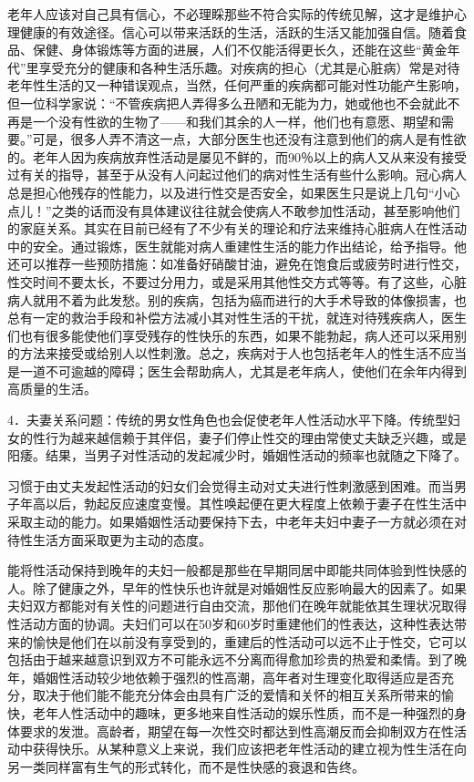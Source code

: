 \documentclass[12pt,UTF8,openany]{ctexbook}
\begin{document}
老年人应该对自己具有信心，不必理睬那些不符合实际的传统见解，这才是维护心理健康的有效途径。信心可以带来活跃的生活，活跃的生活又能加强自信。随着食品、保健、身体锻炼等方面的进展，人们不仅能活得更长久，还能在这些“黄金年代”里享受充分的健康和各种生活乐趣。对疾病的担心（尤其是心脏病）常是对待老年性生活的又一种错误观点，当然，任何严重的疾病都可能对性功能产生影响，但一位科学家说：“不管疾病把人弄得多么丑陋和无能为力，她或他也不会就此不再是一个没有性欲的生物了——和我们其余的人一样，他们也有意愿、期望和需要。”可是，很多人弄不清这一点，大部分医生也还没有注意到他们的病人是有性欲的。老年人因为疾病放弃性活动是屡见不鲜的，而90％以上的病人又从来没有接受过有关的指导，甚至于从没有人问起过他们的病对性生活有些什么影响。冠心病人总是担心他残存的性能力，以及进行性交是否安全，如果医生只是说上几句“小心点儿！”之类的话而没有具体建议往往就会使病人不敢参加性活动，甚至影响他们的家庭关系。其实在目前已经有了不少有关的理论和疗法来维持心脏病人在性活动中的安全。通过锻炼，医生就能对病人重建性生活的能力作出结论，给予指导。他还可以推荐一些预防措施：如准备好硝酸甘油，避免在饱食后或疲劳时进行性交，性交时间不要太长，不要过分用力，或是采用其他性交方式等等。有了这些，心脏病人就用不着为此发愁。别的疾病，包括为癌而进行的大手术导致的体像损害，也总有一定的救治手段和补偿方法减小其对性生活的干扰，就连对待残疾病人，医生们也有很多能使他们享受残存的性快乐的东西，如果不能勃起，病人还可以采用别的方法来接受或给别人以性刺激。总之，疾病对于人也包括老年人的性生活不应当是一道不可逾越的障碍；医生会帮助病人，尤其是老年病人，使他们在余年内得到高质量的生活。

4．夫妻关系问题：传统的男女性角色也会促使老年人性活动水平下降。传统型妇女的性行为越来越信赖于其伴侣，妻子们停止性交的理由常使丈夫缺乏兴趣，或是阳痿。结果，当男子对性活动的发起减少时，婚姻性活动的频率也就随之下降了。

习惯于由丈夫发起性活动的妇女们会觉得主动对丈夫进行性刺激感到困难。而当男子年高以后，勃起反应速度变慢。其性唤起便在更大程度上依赖于妻子在性生活中采取主动的能力。如果婚姻性活动要保持下去，中老年夫妇中妻子一方就必须在对待性生活方面采取更为主动的态度。

能将性活动保持到晚年的夫妇一般都是那些在早期同居中即能共同体验到性快感的人。除了健康之外，早年的性快乐也许就是对婚姻性反应影响最大的因素了。如果夫妇双方都能对有关性的问题进行自由交流，那他们在晚年就能依其生理状况取得性活动方面的协调。夫妇们可以在50岁和60岁时重建他们的性表达，这种性表达带来的愉快是他们在以前没有享受到的，重建后的性活动可以远不止于性交，它可以包括由于越来越意识到双方不可能永远不分离而得愈加珍贵的热爱和柔情。到了晚年，婚姻性活动较少地依赖于强烈的性高潮，高年者对生理变化取得适应是否充分，取决于他们能不能充分体会由具有广泛的爱情和关怀的相互关系所带来的愉快，老年人性活动中的趣味，更多地来自性活动的娱乐性质，而不是一种强烈的身体要求的发泄。高龄者，期望在每一次性交时都达到性高潮反而会抑制双方在性活动中获得快乐。从某种意义上来说，我们应该把老年性活动的建立视为性生活在向另一类同样富有生气的形式转化，而不是性快感的衰退和告终。
\end{document}

